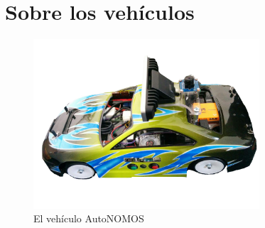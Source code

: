 \documentclass[letterpaper,12pt]{article}
\begin{document}
\section{Sobre los vehículos}

\begin{figure}
  \centering
  \includegraphics[width=0.75\textwidth]{Figures/coverpic.jpg}
  \caption{El vehículo AutoNOMOS}
  \label{fig:AutoNOMOS}
\end{figure}
\end{document}

